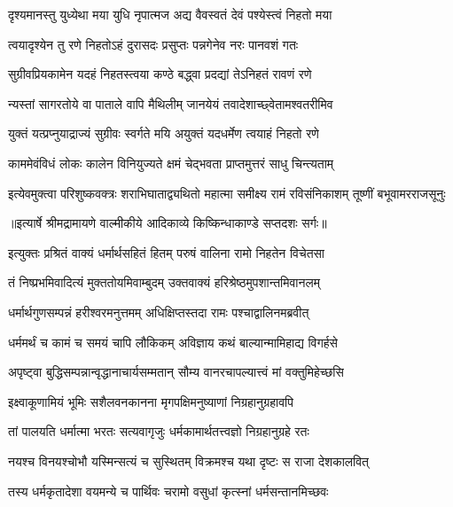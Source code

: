 \twolineshloka
{दृश्यमानस्तु युध्येथा मया युधि नृपात्मज}
{अद्य वैवस्वतं देवं पश्येस्त्वं निहतो मया} %

\twolineshloka
{त्वयादृश्येन तु रणे निहतोऽहं दुरासदः}
{प्रसुप्तः पन्नगेनेव नरः पानवशं गतः} %

\twolineshloka
{सुग्रीवप्रियकामेन यदहं निहतस्त्वया}
{कण्ठे बद्ध्वा प्रदद्यां तेऽनिहतं रावणं रणे} %

\twolineshloka
{न्यस्तां सागरतोये वा पाताले वापि मैथिलीम्}
{जानयेयं तवादेशाच्छ्वेतामश्वतरीमिव} %

\twolineshloka
{युक्तं यत्प्रप्नुयाद्राज्यं सुग्रीवः स्वर्गते मयि}
{अयुक्तं यदधर्मेण त्वयाहं निहतो रणे} %

\twolineshloka
{काममेवंविधं लोकः कालेन विनियुज्यते}
{क्षमं चेद्भवता प्राप्तमुत्तरं साधु चिन्त्यताम्} %

\fourlineindentedshloka
{इत्येवमुक्त्वा परिशुष्कवक्त्रः}
{शराभिघाताद्व्यथितो महात्मा}
{समीक्ष्य रामं रविसंनिकाशम्}
{तूष्णीं बभूवामरराजसूनुः} %


{॥इत्यार्षे श्रीमद्रामायणे वाल्मीकीये आदिकाव्ये किष्किन्धाकाण्डे सप्तदशः सर्गः॥}


\twolineshloka
{इत्युक्तः प्रश्रितं वाक्यं धर्मार्थसहितं हितम्}
{परुषं वालिना रामो निहतेन विचेतसा} %

\twolineshloka
{तं निष्प्रभमिवादित्यं मुक्ततोयमिवाम्बुदम्}
{उक्तवाक्यं हरिश्रेष्ठमुपशान्तमिवानलम्} %

\twolineshloka
{धर्मार्थगुणसम्पन्नं हरीश्वरमनुत्तमम्}
{अधिक्षिप्तस्तदा रामः पश्चाद्वालिनमब्रवीत्} %

\twolineshloka
{धर्ममर्थं च कामं च समयं चापि लौकिकम्}
{अविज्ञाय कथं बाल्यान्मामिहाद्य विगर्हसे} %

\twolineshloka
{अपृष्ट्वा बुद्धिसम्पन्नान्वृद्धानाचार्यसम्मतान्}
{सौम्य वानरचापल्यात्त्वं मां वक्तुमिहेच्छसि} %

\twolineshloka
{इक्ष्वाकूणामियं भूमिः सशैलवनकानना}
{मृगपक्षिमनुष्याणां निग्रहानुग्रहावपि} %

\twolineshloka
{तां पालयति धर्मात्मा भरतः सत्यवागृजुः}
{धर्मकामार्थतत्त्वज्ञो निग्रहानुग्रहे रतः} %

\twolineshloka
{नयश्च विनयश्चोभौ यस्मिन्सत्यं च सुस्थितम्}
{विक्रमश्च यथा दृष्टः स राजा देशकालवित्} %

\twolineshloka
{तस्य धर्मकृतादेशा वयमन्ये च पार्थिवः}
{चरामो वसुधां कृत्स्नां धर्मसन्तानमिच्छवः} %

